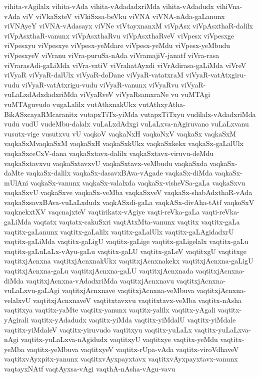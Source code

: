 {vihita-vAgilalx
vihita-vAda
vihita-vAdadadxriMda
vihita-vAdadudx
vihiVna-vAda
viV
viVkaSxteV
viVkiSxsa-beVku
viVNA
viVNA-nAda-gaLanunx
viVNAyeY
viVNA-vAdasayx
viVNe
viVtayxnanxM
viVpAsx
viVpAsxthaR-dalilx
viVpAsxthaR-vanunx
viVpAsxthaRvu
viVpAsxthaRveV
viVpesx
viVpesxge
viVpesxyu
viVpesxye
viVpesx-yeMdare
viVpesx-yeMdu
viVpesx-yeMbudu
viVpesxyeV
viVranu
viVra-puruSa-nAda
viVramajiV-janatf
viVra-rasa
viVrarasAdi-gaLiMda
viVra-vatiV
viVrahatAyxdi
viVrAdirasa-gaLiMda
viVreV
viVyaR
viVyaR-dalUlx
viVyaR-doDane
viVyaR-vatatxraM
viVyaR-vatAtxgiru-vudu
viVyaR-vatAtxrigu-vudu
viVyaR-vanunx
viVyaRvu
viVyaR-vuLaLxdAdxdadxriMda
viVyaRveV
viVyaRsamxraNe
vu
vuMTAgi
vuMTAguvudo
vugaLalilx
vutAthxnakUkx
vutAthxyAtha-BikASxcayaRMcaranitx
vutapxTiTx-yiMda
vutapxTiTxyu
vudilalx-vAdadxriMda
vudu
vudU
vudeMbu-dalalx
vuLaLxdAdxgi
vuLaLxva-nAgiruvano
vuLaLxvanu
vusutx-vige
vusutxvu
vU
vaqkoV
vaqkaNxH
vaqkoNxV
vaqkaSx
vaqkaSxM
vaqkaSxMvaqkaSxM
vaqkaSxH
vaqkaSxkUkx
vaqkaSxkekx
vaqkaSx-gaLalUlx
vaqkaSxceCxV-dana
vaqkaSxtavx-dalilx
vaqkaSxtavx-viruvu-deMdu
vaqkaSxtavxvu
vaqkaSxtavxvU
vaqkaSxtavx-veMbudu
vaqkaSxda
vaqkaSx-daMte
vaqkaSx-dalilx
vaqkaSx-dasavxBAva-vAgade
vaqkaSx-diMda
vaqkaSx-mUlAni
vaqkaSx-vanunx
vaqkaSx-valalxda
vaqkaSx-visheVSa-gaLa
vaqkaSxvu
vaqkaSxvU
vaqkaSxve
vaqkaSx-veMba
vaqkaSxveV
vaqkaSx-shabAdxthaR-vAda
vaqkaSxsavxBAva-vuLaLxdudx
vaqkASxdi-gaLa
vaqkASx-divAha-tAtf
vaqkoSxV
vaqknekxtXV
vaqcnajxteV
vaqtirikatx-vAgiye
vaqti-reVka-gaLa
vaqti-reVka-gaLiMda
vaqtatx
vaqtatx-cakuSxri
vaqtAtxMta-vanunx
vaqtitx
vaqtitx-gaLa
vaqtitx-gaLanunx
vaqtitx-gaLalilx
vaqtitx-gaLalUlx
vaqtitx-gaLAgidadxrU
vaqtitx-gaLiMda
vaqtitx-gaLigU
vaqtitx-gaLige
vaqtitx-gaLigelalx
vaqtitx-gaLu
vaqtitx-gaLuLaLx-vAyu-gaLu
vaqtitx-gaLU
vaqtitx-gaLeV
vaqtitxgU
vaqtitxge
vaqtitxjAcnxna
vaqtitxjAcnxnakUkx
vaqtitxjAcnxnakekx
vaqtitxjAcnxna-gaLigU
vaqtitxjAcnxna-gaLu
vaqtitxjAcnxna-gaLU
vaqtitxjAcnxnada
vaqtitxjAcnxna-diMda
vaqtitxjAcnxna-vAdadxriMda
vaqtitxjAcnxnavu
vaqtitxjAcnxna-vuLaLxvu-gaLAgi
vaqtitxjAcnxnave
vaqtitxjAcnxna-veMbuva
vaqtitxjAcnxna-velalxvU
vaqtitxjAcnxnaveV
vaqtitxtavxvu
vaqtitxtavx-veMba
vaqtitx-nAsha
vaqtitxya
vaqtitx-yaMte
vaqtitx-yanunx
vaqtitx-yalilx
vaqtitx-yAgali
vaqtitx-yAgirali
vaqtitx-yAdadudx
vaqtitx-yiMda
vaqtitx-yiMdalU
vaqtitx-yiMdale
vaqtitx-yiMdaleV
vaqtitx-yiruvudo
vaqtitxyu
vaqtitx-yuLaLx
vaqtitx-yuLaLxva-nAgi
vaqtitx-yuLaLxva-nAgidudx
vaqtitxyU
vaqtitxye
vaqtitx-yeMdu
vaqtitx-yeMba
vaqtitx-yeMbuva
vaqtitxyeV
vaqtitx-rUpa-vAda
vaqtitx-viroVdhaveV
vaqtitxvAyxpitx-yanunx
vaqtitxvAyxpayxtavx
vaqtitxvAyxpayxtavx-vanunx
vaqtayxNAtf
vaqtAyxsa-vAgi
vaqthA-nAsha-vAgu-vavu
}
